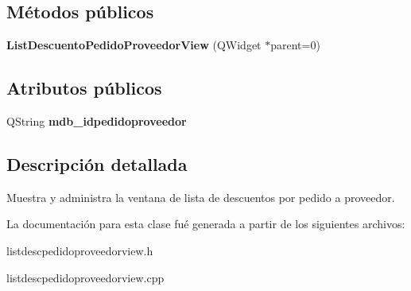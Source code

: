 \subsection*{M\'{e}todos p\'{u}blicos}
\begin{CompactItemize}
\item 
{\bf List\-Descuento\-Pedido\-Proveedor\-View} (QWidget $\ast$parent=0)\label{classListDescuentoPedidoProveedorView_a0}

\end{CompactItemize}
\subsection*{Atributos p\'{u}blicos}
\begin{CompactItemize}
\item 
QString {\bf mdb\_\-idpedidoproveedor}\label{classListDescuentoPedidoProveedorView_o0}

\end{CompactItemize}


\subsection{Descripci\'{o}n detallada}
Muestra y administra la ventana de lista de descuentos por pedido a proveedor. 



La documentaci\'{o}n para esta clase fu\'{e} generada a partir de los siguientes archivos:\begin{CompactItemize}
\item 
listdescpedidoproveedorview.h\item 
listdescpedidoproveedorview.cpp\end{CompactItemize}
